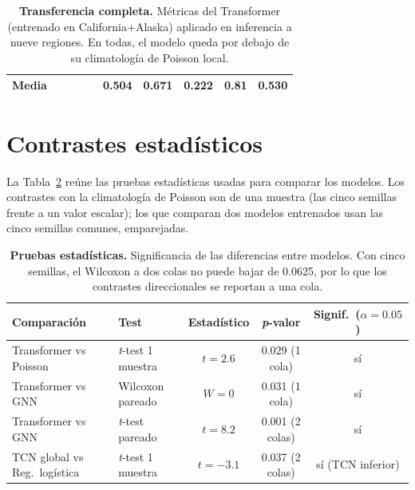 \begin{table}[ht!]
{\begin{tabular}{@{}llcccccccc@{}}
      \midrule
      \textbf{Media}    &                     &                &                 &                    & \textbf{0.504}    & 0.671              & 0.222           & 0.81              & 0.530              \\
      \bottomrule
    \end{tabular}}
  \caption[Resultados completos de transferencia entre regiones]{\textbf{Transferencia completa.} Métricas del Transformer (entrenado en California+Alaska) aplicado en inferencia a nueve regiones. En todas, el modelo queda por debajo de su climatología de Poisson local.}
  \label{tab:transferencia-completa}
\end{table}

\section{Contrastes estadísticos}
\label{apendice-estadistica}

La Tabla~\ref{tab:contrastes} reúne las pruebas estadísticas usadas para comparar los modelos. Los
contrastes con la climatología de Poisson son de una muestra (las cinco semillas frente a un valor
escalar); los que comparan dos modelos entrenados usan las cinco semillas comunes, emparejadas.

\begin{table}[ht!]
  \centering
  \small
  \begin{tabular}{@{}llccc@{}}
    \toprule
    \textbf{Comparación}          & \textbf{Test}           & \textbf{Estadístico} & \textbf{\textit{p}-valor} & \textbf{Signif.\ (\(\alpha=0.05\))} \\
    \midrule
    Transformer vs Poisson        & \emph{t}-test 1 muestra & \(t = 2.6\)          & 0.029 (1 cola)            & sí                                  \\
    Transformer vs GNN            & Wilcoxon pareado        & \(W = 0\)            & 0.031 (1 cola)            & sí                                  \\
    Transformer vs GNN            & \emph{t}-test pareado   & \(t = 8.2\)          & 0.001 (2 colas)           & sí                                  \\
    TCN global vs Reg.\ logística & \emph{t}-test 1 muestra & \(t = -3.1\)         & 0.037 (2 colas)           & sí (TCN inferior)                   \\
    \bottomrule
  \end{tabular}
  \caption[Contrastes estadísticos entre modelos]{\textbf{Pruebas estadísticas.} Significancia de las diferencias entre modelos. Con cinco semillas, el Wilcoxon a dos colas no puede bajar de 0.0625, por lo que los contrastes direccionales se reportan a una cola.}
  \label{tab:contrastes}
\end{table}

